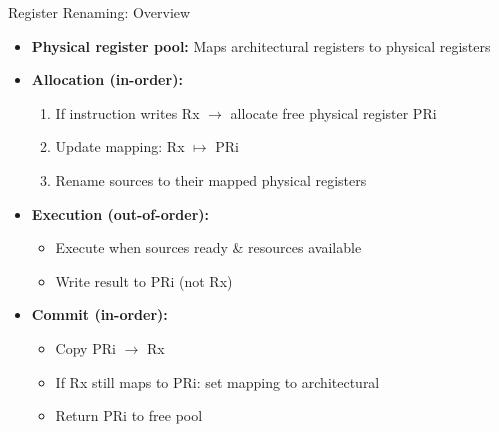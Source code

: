 \documentclass[aspectratio=169,12pt]{beamer}
\begin{document}
\begin{frame}{Register Renaming: Overview}
  \begin{itemize}
    \item \textbf{Physical register pool:} Maps architectural registers to physical registers
    
    \item \textbf{Allocation (in-order):}
    \begin{enumerate}
      \item If instruction writes Rx $\rightarrow$ allocate free physical register PRi
      \item Update mapping: Rx $\mapsto$ PRi
      \item Rename sources to their mapped physical registers
    \end{enumerate}
    
    \item \textbf{Execution (out-of-order):}
    \begin{itemize}
      \item Execute when sources ready \& resources available
      \item Write result to PRi (not Rx)
    \end{itemize}
    
    \item \textbf{Commit (in-order):}
    \begin{itemize}
      \item Copy PRi $\rightarrow$ Rx
      \item If Rx still maps to PRi: set mapping to architectural
      \item Return PRi to free pool
    \end{itemize}
  \end{itemize}
\end{frame}
\end{document}
